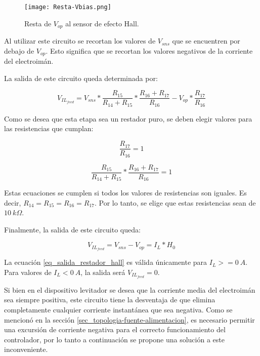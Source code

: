 \begin{figure}[H]
	\centering
	\texttt{[image: Resta-Vbias.png]}
	\caption{Resta de $V_{op}$ al sensor de efecto Hall.}
	\label{fig:img_resta-Vbias}
\end{figure}

Al utilizar este circuito se recortan los valores de $V_{sns}$ que se encuentren por debajo de $V_{op}$. Esto significa que se recortan los valores negativos de la corriente del electroimán.


La salida de este circuito queda determinada por:

\begin{equation}
	V_{IL_{feed}}=V_{sns}*\frac{R_{15}}{R_{14}+R_{15}}*\frac{R_{16}+R_{17}}{R_{16}}-V_{op}*\frac{R_{17}}{R_{16}}
\end{equation}

Como se desea que esta etapa sea un restador puro, se deben elegir valores para las resistencias que cumplan:

\begin{equation}
	\frac{R_{17}}{R_{16}}=1
\end{equation}

\begin{equation}
	\frac{R_{15}}{R_{14}+R_{15}}*\frac{R_{16}+R_{17}}{R_{16}}=1
\end{equation}

Estas ecuaciones se cumplen si todos los valores de resistencias son iguales. Es decir, $R_{14}=R_{15}=R_{16}=R_{17}$. Por lo tanto, se elige que estas resistencias sean de $10\:k\Omega$.

Finalmente, la salida de este circuito queda:

\begin{equation} \label{eq_salida_restador_hall}
	V_{IL_{feed}}=V_{sns}-V_{op}=I_L*H_0
\end{equation}

La ecuación \ref{eq_salida_restador_hall} es válida únicamente para $I_L>=0\:A$. Para valores de $I_L<0\:A$, la salida será $V_{IL_{feed}}=0$.

Si bien en el dispositivo levitador se desea que la corriente media del electroimán sea siempre positiva, este circuito tiene la desventaja de que elimina completamente cualquier corriente instantánea que sea negativa. Como se mencionó en la sección \ref{sec_topologia-fuente-alimentacion}, es necesario permitir una excursión de corriente negativa para el correcto funcionamiento del controlador, por lo tanto a continuación se propone una solución a este inconveniente.

